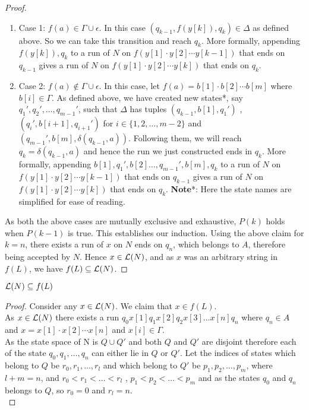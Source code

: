 \begin{soln}
\begin{proof}
		\begin{enumerate}
			\item  Case 1:  $f(a) \in \Gamma \cup \epsilon$.\nl
			In this case $(q_{k-1},f(y[k]),q_k) \in \Delta$ as defined above. So we can take this transition and reach $q_k$.\nl
			More formally,
                appending $f(y[k]), q_k$ to a run of $N$ on $f(y[1] \cdot y[2] \cdots y[k - 1])$ that ends on $q_{k-1}$ gives a run of $N$ on $f(y[1] \cdot y[2] \cdots y[k])$ that ends on $q_k$.
			\item Case 2: $f(a) \not\in \Gamma \cup \epsilon$.\nl
			In this case, let $f(a)=b[1] \cdot b[2] \cdots b[m]$ where $b[i] \in \Gamma$.\nl
			As defined above, we have created new states*,
            say $q_{1}',q_{2}',\ldots, q_{m-1}'$, such that $\Delta$ has tuples $(q_{k-1},b[1],q_1')$ , $(q_i',b[i+1],q_{i+1}')$ for $i\in \{1,2,\ldots,m-2\}$ and $(q_{m-1}',b[m],\delta(q_{k-1},a))$.\nl
            Following them, we will reach $q_k = \delta(q_{k-1},a)$ and hence the run we just constructed ends in $q_k$.\nl
            More formally, appending $b[1], q_1', b[2] \ldots, q_{m-1}', b[m], q_k$ to
            a run of $N$ on $f(y[1] \cdot y[2] \cdots y[k - 1])$ that ends on $q_{k-1}$ gives a run of $N$ on $f(y[1] \cdot y[2] \cdots y[k])$ that ends on $q_k$.\nl
            \textbf{Note}*: Here the state names are simplified for ease of reading.    
		\end{enumerate}

		As both the above cases are mutually exclusive and exhaustive, $P(k)$ holds when $P(k-1)$ is true. This establishes our induction.\nl
		Using the above claim for $k = n$, there exists a run of $x$ on $N$ ends on $q_n$, which belongs to $A$, therefore being accepted by $N$. Hence $x \in \mathcal{L}(N)$, and as $x$ was an
        arbitrary string in $f(L)$, we have $f(L) \subseteq \mathcal{L}(N)$.
	\end{proof}

	\begin{claim}
		$\mathcal{L}(N) \subseteq f(L)$
	\end{claim}
	\begin{proof}
		Consider any $x \in \mathcal{L}(N)$. We claim that $x \in f(L)$.\\

		As $x \in \mathcal{L}(N)$ there exists a run $q_0x[1]q_1x[2]q_2x[3] \ldots x[n]q_n$ where $q_n \in A$ and $x=x[1] \cdot x[2] \cdots x[n]$ and $x[i] \in \Gamma$.\\

		As the state space of N is $Q \cup Q'$ and both $Q$ and $Q'$ are disjoint therefore each of the state $q_0,q_1, \ldots, q_n$ can either lie in $Q$ or $Q'$. Let the indices of states which belong
        to $Q$ be $r_0,r_1, \ldots, r_l$ and which belong to $Q'$ be $p_1,p_2, \ldots, p_m$, where $l+m=n$, and $r_0<r_1<\ldots<r_l$ , $p_1<p_2<\ldots<p_m$ and as the states $q_0$ and $q_n$ belongs to
        $Q$, so
        $r_0=0$ and $r_l=n$.\\


\end{proof}
\end{soln}
